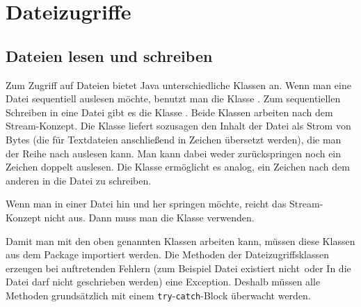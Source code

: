 \chapter{Dateizugriffe}\label{chap:dateizugriffe}
\renewcommand{\chaptertitle}{Dateizugriffe}

\lehead[]{\normalfont\sffamily\hspace*{-2.00cm}\textcolor{white}{\colorbox{lightblue}{\makebox[1.60cm][r]{\thechapter}}}\hspace{0.17cm}\textcolor{lightblue}{\chaptertitle}}
\rohead[]{\textcolor{lightblue}{\chaptertitle}\normalfont\sffamily\hspace*{0.17cm}\textcolor{white}{\colorbox{lightblue}{\makebox[1.60cm][l]{\thechapter}}}\hspace{-2.00cm}}
\rehead[]{\textcolor{lightblue}{AvHG, Inf, My}}
\lohead[]{\textcolor{lightblue}{AvHG, Inf, My}}

\lstset{style=myJava}

\section{Dateien lesen und schreiben}

Zum Zugriff auf Dateien bietet Java unterschiedliche Klassen an. Wenn man eine
Datei sequentiell auslesen möchte, benutzt man die Klasse
. Zum sequentiellen Schreiben in eine Datei gibt es die
Klasse . Beide Klassen arbeiten nach dem
Stream-Konzept. Die Klasse  liefert sozusagen den
Inhalt der Datei als Strom von Bytes (die für Textdateien anschließend in
Zeichen übersetzt werden), die man der Reihe nach auslesen kann. Man kann dabei
weder zurückspringen noch ein Zeichen doppelt auslesen. Die Klasse
 ermöglicht es analog, ein Zeichen nach dem anderen in
die Datei zu schreiben.

Wenn man in einer Datei hin und her springen möchte, reicht das Stream-Konzept
nicht aus. Dann muss man die Klasse  verwenden.

Damit man mit den oben genannten Klassen arbeiten kann, müssen diese Klassen
aus dem Package  importiert werden. Die Methoden der
Dateizugriffsklassen erzeugen bei auftretenden Fehlern (zum Beispiel \glqq Datei
existiert nicht\grqq\ oder \glqq In die Datei darf nicht geschrieben
werden\grqq ) eine Exception. Deshalb müssen alle Methoden grundsätzlich mit
einem \lstinline|try|-\lstinline|catch|-Block überwacht werden.


